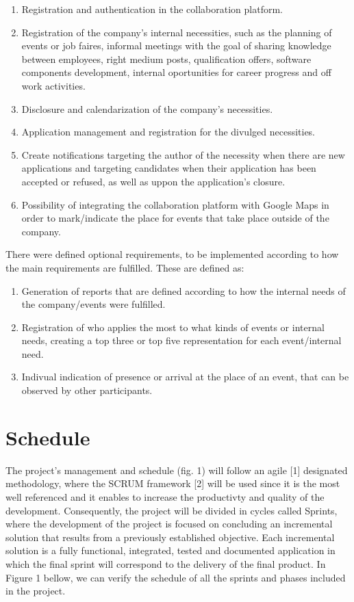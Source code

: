 \documentclass[a4paper,openright,12pt]{report}
\begin{document}
\begin{enumerate}
\item Registration and authentication in the collaboration platform.
\item Registration of the company's internal necessities, such as the planning of events or job faires, informal meetings with the goal of sharing knowledge between employees, right medium posts, qualification offers, software components development, internal oportunities for career progress and off work activities.
\item Disclosure and calendarization of the company's necessities.
\item Application management and registration for the divulged necessities.
\item Create notifications targeting the author of the necessity when there are new applications and targeting candidates when their application has been accepted or refused, as well as uppon the application's closure.
\item Possibility of integrating the collaboration platform with Google Maps in order to mark/indicate the place for events that take place outside of the company.
\end{enumerate}

There were defined optional requirements, to be implemented according to how the main requirements are fulfilled. These are defined as:

\begin{enumerate}
\item Generation of reports that are defined according to how the internal needs of the company/events were fulfilled.
\item Registration of who applies the most to what kinds of events or internal needs, creating a top three or top five representation for each event/internal need. 
\item Indivual indication of presence or arrival at the place of an event, that can be observed by other participants.
\end{enumerate}

\section*{Schedule} 

The project's management and schedule (fig. 1) will follow an agile [1] designated methodology, where the SCRUM framework [2] will be used since it is the most well referenced and it enables to increase the productivty and quality of the development. Consequently, the project will be divided in cycles called Sprints, where the development of the project is focused on concluding an incremental solution that results from a previously established objective. Each incremental solution  is a fully functional, integrated, tested and documented application in which the final sprint will correspond to the delivery of the final product. In Figure 1 bellow, we can verify the schedule of all the sprints and phases included in the project.
\end{document}
